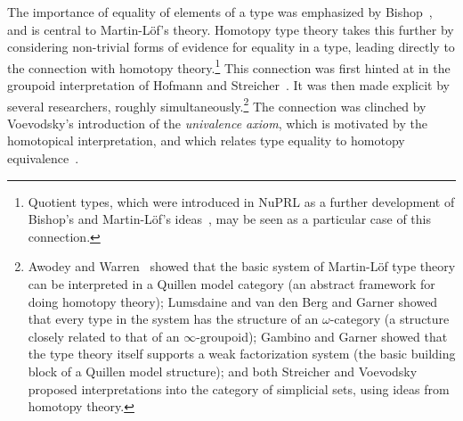 \documentclass[11pt]{article}
\theoremstyle{remark}
\theoremstyle{definition}
\begin{document}
The importance of equality of elements of a type was emphasized by
Bishop~\cite{bishop:ca}, and is central to Martin-L\"{o}f's theory.  Homotopy
type theory takes this further by considering non-trivial forms of evidence for
equality in a type, leading directly to the connection with homotopy
theory.\footnote{Quotient types, which were introduced in NuPRL as a further
  development of Bishop's and Martin-L\"{o}f's ideas~\cite{NuPRL}, may be seen
  as a particular case of this connection.}  This connection was first hinted at
in the groupoid interpretation of Hofmann and
Streicher~\cite{HS,HofmannM:gromtt}.  It was then made explicit by several
researchers, roughly simultaneously.\footnote{%
  Awodey and Warren~\cite{AW} showed that the basic system of Martin-L\"{o}f
  type theory can be interpreted in a Quillen model category (an abstract
  framework for doing homotopy theory); Lumsdaine \cite{L} and van den Berg and
  Garner \cite{vandenBergB:typwg} showed that every type in the system has the
  structure of an $\omega$-category (a structure closely related to that of an
  $\infty$-groupoid); Gambino and Garner \cite{GG} showed that the type theory
  itself supports a weak factorization system (the basic building block of a
  Quillen model structure); and both Streicher \cite{StreicherNote} and
  Voevodsky \cite{VVnote} proposed interpretations into the category of
  simplicial sets, using ideas from homotopy theory.}  The connection was
clinched by Voevodsky's introduction of the \emph{univalence axiom}, which is
motivated by the homotopical interpretation, and which relates type equality to
homotopy equivalence~\cite{KLV,APW}.

\end{document}
